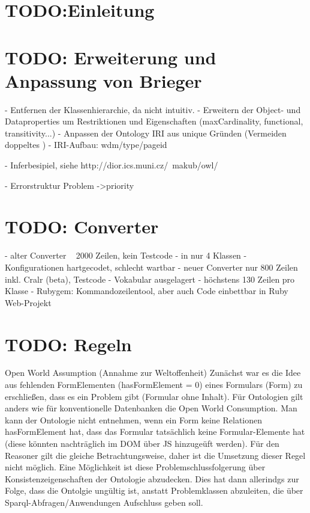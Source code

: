 \documentclass[runningheads,a4paper]{llncs}
\begin{document}
\section{TODO:Einleitung}

\newpage
\section{TODO: Erweiterung und Anpassung von Brieger}

- Entfernen der Klassenhierarchie, da nicht intuitiv.
- Erweitern der Object- und Dataproperties um Restriktionen und Eigenschaften (maxCardinality, functional, transitivity...)
- Anpassen der Ontology IRI aus unique Gründen (Vermeiden doppeltes )
- IRI-Aufbau: {wdm}/{type}/{page}{id}

- Inferbesipiel, siehe http://dior.ics.muni.cz/~makub/owl/  

- Errorstruktur
Problem
    ->priority
\newpage

\section{TODO: Converter}

- alter Converter ~ 2000 Zeilen, kein Testcode
- in nur 4 Klassen
- Konfigurationen hartgecodet, schlecht wartbar
- neuer Converter nur 800 Zeilen inkl. Cralr (beta), Testcode
- Vokabular ausgelagert
- höchstens 130 Zeilen pro Klasse
- Rubygem: Kommandozeilentool, aber auch Code einbettbar in Ruby Web-Projekt

\section{TODO: Regeln}

Open World Assumption (Annahme zur Weltoffenheit)
Zunächst war es die Idee aus fehlenden FormElementen (hasFormElement = 0) eines Formulars (Form) zu erschließen, dass es ein Problem gibt (Formular ohne Inhalt). Für Ontologien gilt anders wie für konventionelle Datenbanken die Open World Consumption. Man kann der Ontologie nicht entnehmen, wenn ein Form keine Relationen hasFormElement hat, dass das Formular tatsächlich keine Formular-Elemente hat (diese könnten nachträglich im DOM über JS hinzugeüft werden).
Für den Reasoner gilt die gleiche Betrachtungsweise, daher ist die Umsetzung dieser Regel nicht möglich.
Eine Möglichkeit ist diese Problemschlussfolgerung über Konsistenzeigenschaften der Ontologie abzudecken. Dies hat dann allerindgs  zur Folge, dass die Ontolgie ungültig ist, anstatt Problemklassen abzuleiten, die über Sparql-Abfragen/Anwendungen Aufschluss geben soll.
\end{document}
